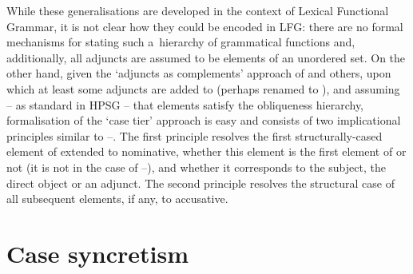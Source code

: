 \documentclass[output=paper]{langsci/langscibook}
\begin{document}
While these generalisations are developed in the context of Lexical Functional Grammar, it is not clear how they could be encoded in LFG: there are no formal mechanisms for stating such a~hierarchy of grammatical functions and, additionally, all adjuncts are assumed to be elements of an unordered set.  On the other hand, given the `adjuncts as complements’ approach of \citealt{BMS2001a-unlinked} and others, upon which at least some adjuncts are added to  (perhaps renamed to ), and assuming – as standard in HPSG – that  elements satisfy the obliqueness hierarchy, formalisation of the `case tier’ approach is easy and consists of two implicational principles similar to –.  The first principle resolves the first structurally-cased element of extended  to nominative, whether this element is the first element of  or not (it is not in the case of –), and whether it corresponds to the subject, the direct object or an adjunct.  The second principle resolves the structural case of all subsequent elements, if any, to accusative.






\section{Case syncretism}
\label{sec:case:syn}
\end{document}
